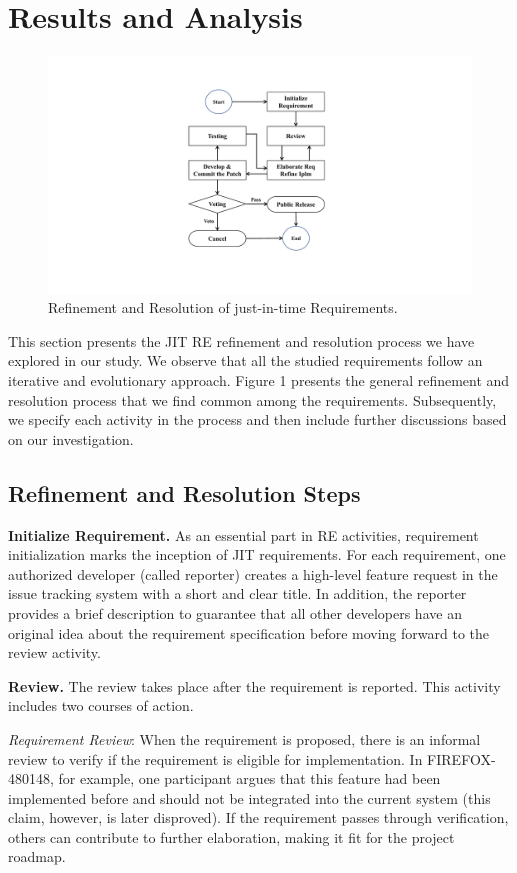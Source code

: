 \documentclass[review]{elsarticle}
\begin{document}
\section{Results and Analysis}
\begin{figure}[t]
 	\center
	\includegraphics[page=1, width=.85\columnwidth]{jit.pdf}
	\caption{Refinement and Resolution of just-in-time Requirements.}
	\label{JIT}
\end{figure}

This section presents the JIT RE refinement and resolution process we have explored in our study. We observe that all the studied requirements follow an iterative and evolutionary approach. Figure 1 presents the general refinement and resolution process that we find common among the requirements. Subsequently, we specify each activity in the process and then include further discussions based on our investigation.

\subsection{Refinement and Resolution Steps}
\textbf{Initialize Requirement.} As an essential part in RE activities, requirement initialization marks the inception of JIT requirements. For each requirement, one authorized developer (called reporter) creates a high-level feature request in the issue tracking system with a short and clear title. In addition, the reporter provides a brief description to guarantee that all other developers have an original idea about the requirement specification before moving forward to the review activity.

\textbf{Review.} The review takes place after the requirement is reported. This activity includes two courses of action.

\textit{Requirement Review}: When the requirement is proposed, there is an informal review to verify if the requirement is eligible for implementation. In FIREFOX-480148, for example, one participant argues that this feature had been implemented before and should not be integrated into the current system (this claim, however, is later disproved). If the requirement passes through verification,  others can contribute to further elaboration, making it fit for the project roadmap.
\end{document}
